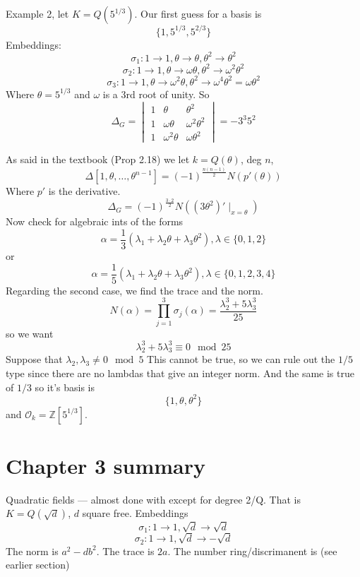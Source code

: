 \documentclass{article}
\begin{document}
Example 2, let $K = Q(5^{1/3})$. Our first guess for a basis is 
\[ \{1, 5^{1/3}, 5^{2/3} \} \]
Embeddings: 
\[ \sigma_1: 1 \rightarrow 1, \theta \rightarrow \theta, \theta^2 \rightarrow
\theta^2 \]
\[ \sigma_2 : 1\rightarrow 1, \theta \rightarrow \omega\theta, \theta^2
\rightarrow \omega^2 \theta^2 \]
\[ \sigma_3 : 1 \rightarrow 1, \theta \rightarrow \omega^2 \theta, \theta^2
\rightarrow \omega^4 \theta^2 = \omega \theta^2 \]
Where $\theta = 5^{1/3}$ and $\omega$ is a 3rd root of unity.
So
\[ \Delta_G = \begin{vmatrix} 1 & \theta & \theta^2 \\
1 & \omega \theta & \omega^2 \theta^2 \\
1 & \omega^2 \theta & \omega \theta^2 \end{vmatrix} = -3^3 5^2 \]

As said in the textbook (Prop 2.18) we let $k = Q(\theta)$, deg $n$,
\[ \Delta[1,\theta,\ldots,\theta^{n-1}] = (-1)^{\frac{n(n-1)}{2}} N(p'(\theta)) \]
Where $p'$ is the derivative.
\[ \Delta_G = (-1)^{\frac{3\cdot 2}{2}} N((3\theta^2)'\mid_{x=\theta}) \]
Now check for algebraic ints of the forms
\[ \alpha = \frac{1}{3} (\lambda_1 + \lambda_2 \theta + \lambda_3 \theta^2),
\lambda \in \{0,1,2\} \]
or
\[ \alpha = \frac{1}{5} (\lambda_1 + \lambda_2 \theta + \lambda_3 \theta^2),
\lambda \in \{0,1,2,3,4\} \]
Regarding the second case, we find the trace and the norm. 
\[ N(\alpha) = \prod_{j = 1}^3 \sigma_j(\alpha) =
\frac{\lambda_2^3+5\lambda_3^3}{25} \]
so we want
\[ \lambda_2^3 + 5 \lambda_3^3 \equiv 0 \mod 25 \]
Suppose that $\lambda_2,\lambda_3 \neq 0 \mod 5$
This cannot be true, so we can rule out the $1/5$ type since there are no
lambdas that give an integer norm. And the same is true of $1/3$ so it's basis
is \[ \{1,\theta,\theta^2\} \]
and $\mathcal{O}_k = \mathbb{Z}[5^{1/3}]$. 

\section*{Chapter 3 summary}
Quadratic fields --- almost done with except for degree 2/Q. That is $K =
Q(\sqrt{d})$, $d$ square free. Embeddings 
\[ \sigma_1 : 1 \rightarrow 1, \sqrt{d} \rightarrow \sqrt{d} \]
\[ \sigma_2 : 1 \rightarrow 1, \sqrt{d} \rightarrow - \sqrt{d} \]
The norm is $a^2 - d b^2$. The trace is $2a$. The number ring/discrimanent is
(see earlier section)
\end{document}
